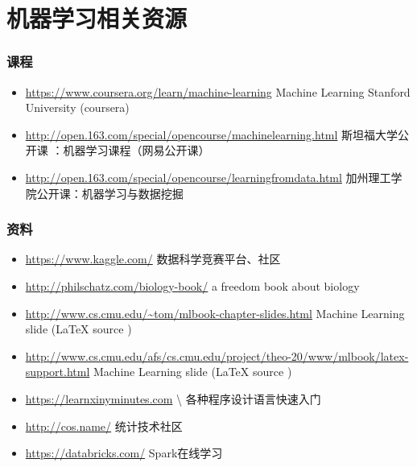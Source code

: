 \documentclass{beamer}
\begin{document}
\section{机器学习相关资源}
\label{sec-6}
\begin{frame}
\frametitle{课程}
\label{sec-6-1}


\begin{itemize}
\item \href{https://www.coursera.org/learn/machine-learning}{https://www.coursera.org/learn/machine-learning}  Machine Learning Stanford University (coursera)
\item \href{http://open.163.com/special/opencourse/machinelearning.html}{http://open.163.com/special/opencourse/machinelearning.html}  斯坦福大学公开课 ：机器学习课程（网易公开课）
\item \href{http://open.163.com/special/opencourse/learningfromdata.html}{http://open.163.com/special/opencourse/learningfromdata.html} 加州理工学院公开课：机器学习与数据挖掘
\end{itemize}
\end{frame}
\begin{frame}
\frametitle{资料}
\label{sec-6-2}

\begin{itemize}
\item \href{https://www.kaggle.com/}{https://www.kaggle.com/}
    数据科学竞赛平台、社区
\item \href{http://philschatz.com/biology-book/}{http://philschatz.com/biology-book/}  
    a  freedom book about biology
\item \href{http://www.cs.cmu.edu/~tom/mlbook-chapter-slides.html}{http://www.cs.cmu.edu/\textasciitilde tom/mlbook-chapter-slides.html}
    Machine Learning slide (\LaTeX{} source )
\item \href{http://www.cs.cmu.edu/afs/cs.cmu.edu/project/theo-20/www/mlbook/latex-support.html}{http://www.cs.cmu.edu/afs/cs.cmu.edu/project/theo-20/www/mlbook/latex-support.html} 
    Machine Learning slide (\LaTeX{} source )
\item \href{https://learnxinyminutes.com}{https://learnxinyminutes.com}  \textbackslash{}
    各种程序设计语言快速入门
\item \href{http://cos.name/}{http://cos.name/}
    统计技术社区
\item \href{https://databricks.com/}{https://databricks.com/}
    Spark在线学习
\end{itemize}
\end{frame}
\end{document}
